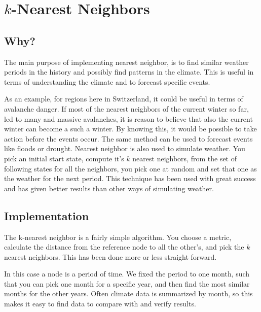 \section{$k$-Nearest Neighbors}

\subsection{Why?} %

The main purpose of implementing nearest neighbor, is to find similar weather
periods in the history and possibly find patterns in the climate. This is useful
in terms of understanding the climate and to forecast specific events. 

As an example, for regions here in Switzerland, it could be useful in terms of avalanche
danger. If most of the nearest neighbors of the current winter so far, led to
many and massive avalanches, it is reason to believe that also the current
winter can become a such a winter. By knowing this, it would be possible to take
action before the events occur. The same method can be used to forecast events
like floods or drought. Nearest neighbor is also used to simulate weather. You pick
an initial start state, compute it's $k$ nearest neighbors, from the set of 
following states for all the neighbors, you pick one at random and set that one as
the weather for the next period. This technique has been used with great success
and has given better results than other ways of simulating weather. 



\subsection{Implementation} %

The k-nearest neighbor is a fairly simple algorithm. You choose a metric,
calculate the distance from the reference node to all the other's, and pick the
$k$ nearest neighbors. This has been done more or less straight forward.

In this case a node is a period of time. We fixed the period to one month, such
that you can pick one month for a specific year, and then find the most similar
months for the other years. Often climate data is summarized by month, so this
makes it easy to find data to compare with and verify results.

